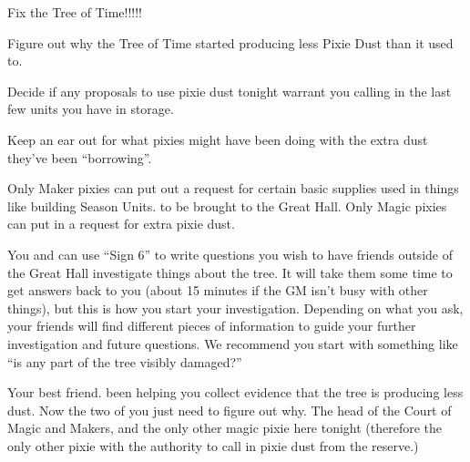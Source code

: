 \documentclass[char]{PP}
\begin{document}
\begin{itemz}
	\item Fix the Tree of Time!!!!!
	\item Figure out why the Tree of Time started producing less Pixie Dust than it used to.
	\item Decide if any proposals to use pixie dust tonight warrant you calling in the last few units you have in storage.
	\item Keep an ear out for what pixies might have been doing with the extra dust they’ve been “borrowing”.
\end{itemz}

\begin{itemz}[Notes]
	\item Only Maker pixies can put out a request for certain basic supplies used in things like building Season Units. to be brought to the Great Hall. Only Magic pixies can put in a request for extra pixie dust.
	\item You and \cSHelp{} can use ``Sign 6'' to write questions you wish to have friends outside of the Great Hall investigate things about the tree. It will take them some time to get answers back to you (about 15 minutes if the GM isn't busy with other things), but this is how you start your investigation. Depending on what you ask, your friends will find different pieces of information to guide your further investigation and future questions. We recommend you start with something like ``is any part of the tree visibly damaged?''
\end{itemz}

\begin{contacts}
	\contact{\cSHelp{}} Your best friend. \cSHelp{\They} \cSHelp{\have} been helping you collect evidence that the tree is producing less dust. Now the two of you just need to figure out why.
	\contact{\cMHead{}} The head of the Court of Magic and Makers, and the only other magic pixie here tonight (therefore the only other pixie with the authority to call in pixie dust from the reserve.)
\end{contacts}
\end{document}
